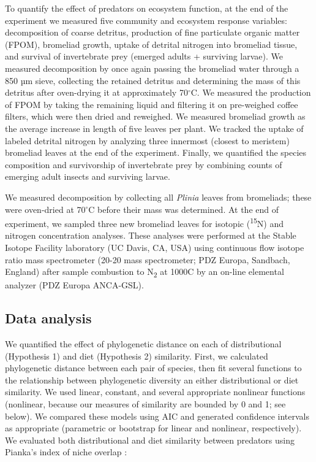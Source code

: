 To quantify the effect of predators on ecosystem function, at the end of
the experiment we measured five community and ecosystem response
variables: decomposition of coarse detritus, production of fine
particulate organic matter (FPOM), bromeliad growth, uptake of detrital
nitrogen into bromeliad tissue, and survival of invertebrate prey
(emerged adults + surviving larvae). We measured decomposition by once
again passing the bromeliad water through a 850 µm sieve, collecting the
retained detritus and determining the mass of this detritus after
oven-drying it at approximately 70\(^\circ\)C. We measured the
production of FPOM by taking the remaining liquid and filtering it on
pre-weighed coffee filters, which were then dried and reweighed. We
measured bromeliad growth as the average increase in length of five
leaves per plant. We tracked the uptake of labeled detrital nitrogen by
analyzing three innermost (closest to meristem) bromeliad leaves at the
end of the experiment. Finally, we quantified the species composition
and survivorship of invertebrate prey by combining counts of emerging
adult insects and surviving larvae.

We measured decomposition by collecting all \emph{Plinia} leaves from
bromeliads; these were oven-dried at 70\(^\circ\)C before their mass was
determined. At the end of experiment, we sampled three new bromeliad
leaves for isotopic (\textsuperscript{15}N) and nitrogen concentration
analyses. These analyses were performed at the Stable Isotope Facility
laboratory (UC Davis, CA, USA) using continuous flow isotope ratio mass
spectrometer (20-20 mass spectrometer; PDZ Europa, Sandbach, England)
after sample combustion to N\textsubscript{2} at 1000C by an on-line
elemental analyzer (PDZ Europa ANCA-GSL).

\subsection{Data analysis}\label{data-analysis}

We quantified the effect of phylogenetic distance on each of
distributional (Hypothesis 1) and diet (Hypothesis 2) similarity. First,
we calculated phylogenetic distance between each pair of species, then
fit several functions to the relationship between phylogenetic diversity
an either distributional or diet similarity. We used linear, constant,
and several appropriate nonlinear functions (nonlinear, because our
measures of similarity are bounded by 0 and 1; see below). We compared
these models using AIC and generated confidence intervals as appropriate
(parametric or bootstrap for linear and nonlinear, respectively). We
evaluated both distributional and diet similarity between predators
using Pianka's index of niche overlap \citep{Pianka1974}:

